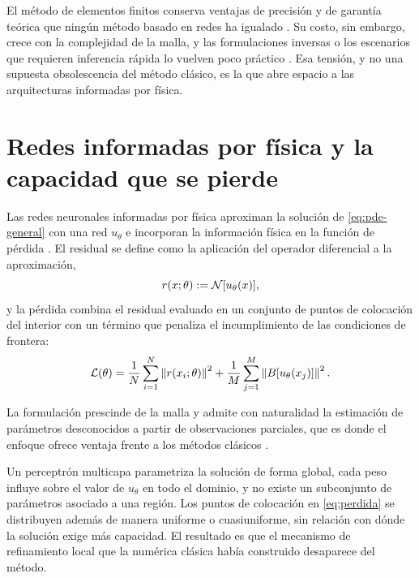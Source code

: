
El método de elementos finitos conserva ventajas de precisión y de garantía teórica que ningún método basado en redes ha igualado \cite{lu2021deepxde}. Su costo, sin embargo, crece con la complejidad de la malla, y las formulaciones inversas o los escenarios que requieren inferencia rápida lo vuelven poco práctico \cite{karniadakis2021}. Esa tensión, y no una supuesta obsolescencia del método clásico, es la que abre espacio a las arquitecturas informadas por física.

\section{Redes informadas por física y la capacidad que se pierde}

Las redes neuronales informadas por física aproximan la solución de \eqref{eq:pde-general} con una red $u_\theta$ e incorporan la información física en la función de pérdida \cite{raissi2019}. El residual se define como la aplicación del operador diferencial a la aproximación,
\begin{equation}
  r(x;\theta) := \mathcal{N}[u_\theta(x)],
  \label{eq:residual}
\end{equation}
y la pérdida combina el residual evaluado en un conjunto de puntos de colocación del interior con un término que penaliza el incumplimiento de las condiciones de frontera:
\begin{equation}
  \mathcal{L}(\theta)
  = \frac{1}{N}\sum_{i=1}^{N} \left\| r(x_i;\theta) \right\|^2
  + \frac{1}{M}\sum_{j=1}^{M} \left\| B[u_\theta(x_j)] \right\|^2 .
  \label{eq:perdida}
\end{equation}

La formulación prescinde de la malla y admite con naturalidad la estimación de parámetros desconocidos a partir de observaciones parciales, que es donde el enfoque ofrece ventaja frente a los métodos clásicos \cite{raissi2019}.

Un perceptrón multicapa parametriza la solución de forma global,  cada peso influye sobre el valor de $u_\theta$ en todo el dominio, y no existe un subconjunto de parámetros asociado a una región. Los puntos de colocación en \eqref{eq:perdida} se distribuyen además de manera uniforme o cuasiuniforme, sin relación con dónde la solución exige más capacidad. El resultado es que el mecanismo de refinamiento local que la numérica clásica había construido desaparece del método.

